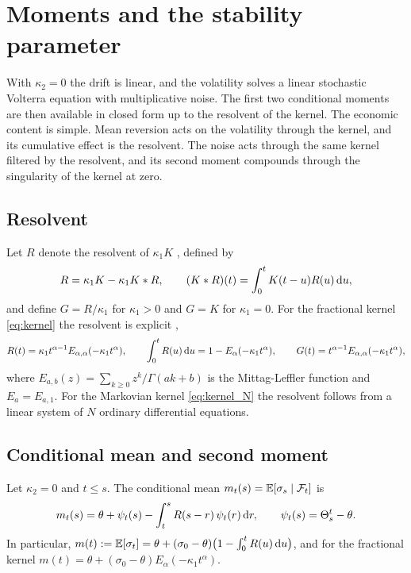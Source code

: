 \section{Moments and the stability parameter}\label{sec:moments}

With $\kappa_2=0$ the drift is linear, and the volatility solves a linear stochastic Volterra equation with multiplicative noise. The first two conditional moments are then available in closed form up to the resolvent of the kernel. The economic content is simple. Mean reversion acts on the volatility through the kernel, and its cumulative effect is the resolvent. The noise acts through the same kernel filtered by the resolvent, and its second moment compounds through the singularity of the kernel at zero.

\subsection{Resolvent}

Let $R$ denote the resolvent of $\kappa_1K$ \citep[Chapter~2]{GripenbergLondenStaffans1990}, defined by
\begin{equation}\label{eq:resolvent}
R=\kappa_1K-\kappa_1K*R,\qquad (K*R)(t)=\int_0^tK(t-u)R(u)\,\D u,
\end{equation}
and define $G=R/\kappa_1$ for $\kappa_1>0$ and $G=K$ for $\kappa_1=0$. For the fractional kernel \eqref{eq:kernel} the resolvent is explicit \citep{ElEuchRosenbaum2019},
\begin{equation}\label{eq:resolvent_frac}
R(t)=\kappa_1t^{\alpha-1}E_{\alpha,\alpha}(-\kappa_1t^{\alpha}),\qquad \int_0^tR(u)\,\D u=1-E_\alpha(-\kappa_1t^\alpha),\qquad G(t)=t^{\alpha-1}E_{\alpha,\alpha}(-\kappa_1t^{\alpha}),
\end{equation}
where $E_{a,b}(z)=\sum_{k\ge0}z^k/\Gamma(ak+b)$ is the Mittag-Leffler function and $E_a=E_{a,1}$. For the Markovian kernel \eqref{eq:kernel_N} the resolvent follows from a linear system of $N$ ordinary differential equations.

\subsection{Conditional mean and second moment}

\begin{proposition}\label{prop:mean}
Let $\kappa_2=0$ and $t\le s$. The conditional mean $m_t(s)=\mathbb{E}[\sigma_s\mid\mathcal{F}_t]$ is
\begin{equation}\label{eq:cond_mean}
m_t(s)=\theta+\psi_t(s)-\int_t^sR(s-r)\,\psi_t(r)\,\D r,\qquad \psi_t(s)=\Theta^t_s-\theta .
\end{equation}
In particular, $m(t):=\mathbb{E}[\sigma_t]=\theta+(\sigma_0-\theta)\big(1-\int_0^tR(u)\,\mathrm{d} u\big)$, and for the fractional kernel $m(t)=\theta+(\sigma_0-\theta)E_\alpha(-\kappa_1t^\alpha)$.
\end{proposition}

